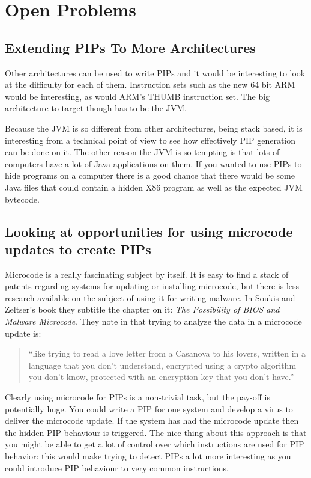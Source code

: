 \documentclass[10pt,]{book}
\begin{document}
\section{Open Problems}

\subsection{Extending PIPs To More Architectures}

Other architectures can be used to write PIPs and it would be
interesting to look at the difficulty for each of them. Instruction sets
such as the new 64 bit ARM would be interesting, as would ARM's THUMB
instruction set. The big architecture to target though has to be the
JVM.

Because the JVM is so different from other architectures, being stack
based, it is interesting from a technical point of view to see how
effectively PIP generation can be done on it. The other reason the JVM
is so tempting is that lots of computers have a lot of Java applications
on them. If you wanted to use PIPs to hide programs on a computer there
is a good chance that there would be some Java files that could contain
a hidden X86 program as well as the expected JVM bytecode.

\subsection{Looking at opportunities for using microcode updates to
create PIPs}

Microcode is a really fascinating subject by itself. It is easy to find
a stack of patents regarding systems for updating or installing
microcode\autocite{Demke:2000uf}\autocite{Tung:2004tm}\autocite{Langford:2006uf},
but there is less research available on the subject of using it for
writing malware. In Soukis and Zeltser's book \autocite{Skoudis:2004to}
they subtitle the chapter on it: \emph{The Possibility of BIOS and
Malware Microcode}. They note in \autocite{Skoudis:2004to} that trying
to analyze the data in a microcode update is:

\begin{quote}
``like trying to read a love letter from a Casanova to his lovers,
written in a language that you don't understand, encrypted using a
crypto algorithm you don't know, protected with an encryption key that
you don't have.''

\end{quote}
Clearly using microcode for PIPs is a non-trivial task, but the pay-off
is potentially huge. You could write a PIP for one system and develop a
virus to deliver the microcode update. If the system has had the
microcode update then the hidden PIP behaviour is triggered. The nice
thing about this approach is that you might be able to get a lot of
control over which instructions are used for PIP behavior: this would
make trying to detect PIPs a lot more interesting as you could introduce
PIP behaviour to very common instructions.
\end{document}
